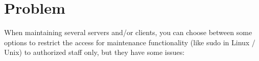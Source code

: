 %
%
%
%
%
%
%


\section{Problem}

When maintaining several servers and/or clients, you can choose between some
options to restrict the access for maintenance functionality (like sudo in
Linux / Unix) to authorized staff only, but they have some issues:

